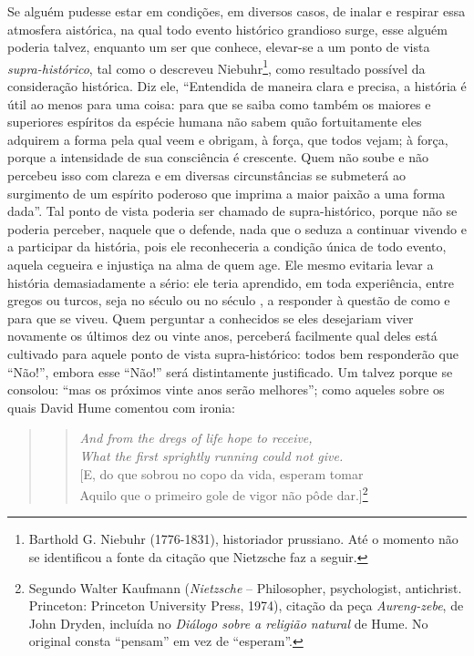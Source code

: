 Se alguém pudesse estar em condições, em diversos casos, de inalar e
respirar essa atmosfera aistórica, na qual todo evento histórico
grandioso surge, esse alguém poderia talvez, enquanto um ser que
conhece, elevar-se a um ponto de vista \emph{supra-histórico}, tal como
o descreveu Niebuhr\footnote{Barthold G. Niebuhr (1776-1831),
  historiador prussiano. Até o momento não se identificou a fonte da
  citação que Nietzsche faz a seguir.}, como resultado possível da
consideração histórica. Diz ele, ``Entendida de maneira clara e precisa,
a história é útil ao menos para uma coisa: para que se saiba como também
os maiores e superiores espíritos da espécie humana não sabem quão
fortuitamente eles adquirem a forma pela qual veem e obrigam, à força,
que todos vejam; à força, porque a intensidade de sua consciência é
crescente. Quem não soube e não percebeu isso com clareza e em diversas
circunstâncias se submeterá ao surgimento de um espírito poderoso que
imprima a maior paixão a uma forma dada''. Tal ponto de vista poderia
ser chamado de supra-histórico, porque não se poderia perceber, naquele
que o defende, nada que o seduza a continuar vivendo e a participar da
história, pois ele reconheceria a condição única de todo evento, aquela
cegueira e injustiça na alma de quem age. Ele mesmo evitaria levar a
história demasiadamente a sério: ele teria aprendido, em toda
experiência, entre gregos ou turcos, seja no século  ou no século ,
a responder à questão de como e para que se viveu. Quem perguntar a
conhecidos se eles desejariam viver novamente os últimos dez ou vinte
anos, perceberá facilmente qual deles está cultivado para aquele ponto
de vista supra-histórico: todos bem responderão que ``Não!'', embora
esse ``Não!'' será distintamente justificado. Um talvez porque se
consolou: ``mas os próximos vinte anos serão melhores''; como aqueles
sobre os quais David Hume comentou com ironia:

\begin{quote}
\begin{verse}
\emph{And from the dregs of life hope to receive,}\\
\emph{What the first sprightly running could not give.}\\
{[}E, do que sobrou no copo da vida, esperam tomar\\
Aquilo que o primeiro gole de vigor não pôde dar.{]}\footnote{Segundo
  Walter Kaufmann (\emph{Nietzsche} -- Philosopher, psychologist,
  antichrist. Princeton: Princeton University Press, 1974),
  citação da peça \emph{Aureng-zebe}, de John Dryden, incluída no
  \emph{Diálogo sobre a religião natural} de Hume. No original consta
  ``pensam'' em vez de ``esperam''.}
\end{verse}
\end{quote}


